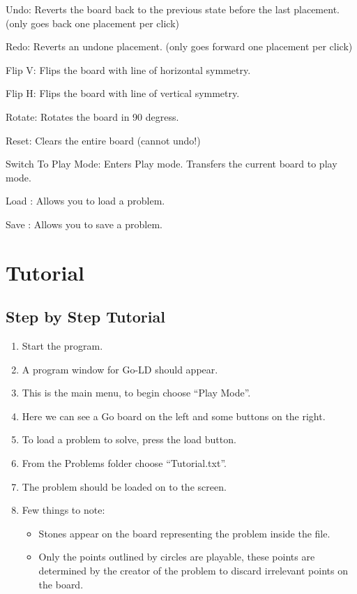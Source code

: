 \documentclass{l4proj}
\begin{document}
\begin{appendices}
Undo: Reverts the board back to the previous state before the last placement. (only goes back one placement per click)

Redo: Reverts an undone placement. (only goes forward one placement per click)

Flip V: Flips the board with line of horizontal symmetry.

Flip H: Flips the board with line of vertical  symmetry.

Rotate: Rotates the board in 90 degress.

Reset: Clears the entire board (cannot undo!)



Switch To Play Mode: Enters Play mode. Transfers the current board to play mode.

Load : Allows you to load a problem.

Save : Allows you to save a problem.

\section{Tutorial}

\subsection{Step by Step Tutorial}


\begin{enumerate}
\item Start the program.
\item A program window for Go-LD should appear.
\item This is the main menu, to begin choose “Play Mode”.
\item Here we can see a Go board on the left and some buttons on the right.
\item To load a problem to solve, press the load button.
\item From the Problems folder choose  “Tutorial.txt”.
\item The problem should be loaded on to the screen.
\item Few things to note:
\begin{itemize}

\item Stones appear on the board representing the problem inside the file.

\item Only the points outlined by circles are playable, these points are determined by the creator of the problem to discard irrelevant points on the board.


\end{itemize}
\end{enumerate}
\end{appendices}
\end{document}
